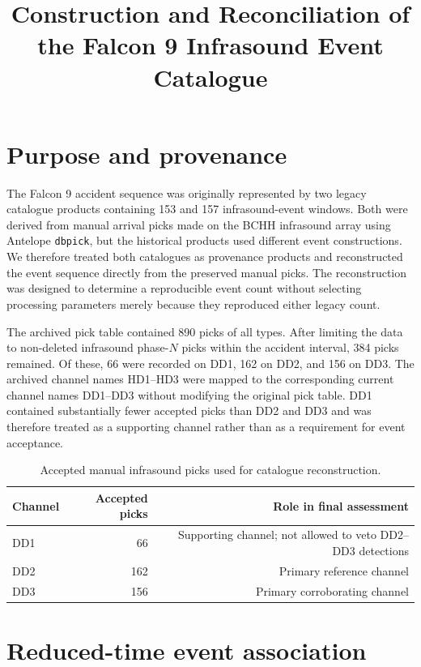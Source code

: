 \documentclass[11pt]{article}
\title{Construction and Reconciliation of the Falcon 9 Infrasound Event Catalogue}
\author{}
\date{}
\begin{document}
\maketitle

\section{Purpose and provenance}

The Falcon 9 accident sequence was originally represented by two legacy
catalogue products containing 153 and 157 infrasound-event windows. Both were
derived from manual arrival picks made on the BCHH infrasound array using
Antelope \texttt{dbpick}, but the historical products used different event
constructions. We therefore treated both catalogues as provenance products and
reconstructed the event sequence directly from the preserved manual picks.
The reconstruction was designed to determine a reproducible event count
without selecting processing parameters merely because they reproduced either
legacy count.

The archived pick table contained 890 picks of all types. After limiting the
data to non-deleted infrasound phase-\(N\) picks within the accident interval,
384 picks remained. Of these, 66 were recorded on DD1, 162 on DD2, and 156 on
DD3. The archived channel names HD1--HD3 were mapped to the corresponding
current channel names DD1--DD3 without modifying the original pick table.
DD1 contained substantially fewer accepted picks than DD2 and DD3 and was
therefore treated as a supporting channel rather than as a requirement for
event acceptance.

\begin{table}[htbp]
\centering
\caption{Accepted manual infrasound picks used for catalogue reconstruction.}
\label{tab:accepted_picks}
\begin{tabular}{lrr}
\toprule
Channel & Accepted picks & Role in final assessment \\
\midrule
DD1 & 66  & Supporting channel; not allowed to veto DD2--DD3 detections \\
DD2 & 162 & Primary reference channel \\
DD3 & 156 & Primary corroborating channel \\
\bottomrule
\end{tabular}
\end{table}

\section{Reduced-time event association}
\end{document}
